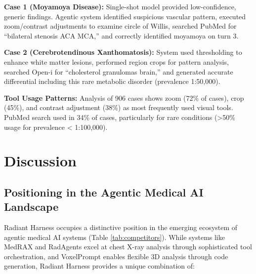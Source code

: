 \documentclass[11pt]{article}
\begin{document}
\textbf{Case 1 (Moyamoya Disease):} Single-shot model provided low-confidence, generic findings. Agentic system identified suspicious vascular pattern, executed zoom/contrast adjustments to examine circle of Willis, searched PubMed for ``bilateral stenosis ACA MCA,'' and correctly identified moyamoya on turn 3.

\textbf{Case 2 (Cerebrotendinous Xanthomatosis):} System used thresholding to enhance white matter lesions, performed region crops for pattern analysis, searched Open-i for ``cholesterol granulomas brain,'' and generated accurate differential including this rare metabolic disorder (prevalence 1:50,000).

\textbf{Tool Usage Patterns:} Analysis of 906 cases shows zoom (72\% of cases), crop (45\%), and contrast adjustment (38\%) as most frequently used visual tools. PubMed search used in 34\% of cases, particularly for rare conditions (\textgreater50\% usage for prevalence < 1:100,000).

\section{Discussion}
\label{sec:discussion}

\subsection{Positioning in the Agentic Medical AI Landscape}

Radiant Harness occupies a distinctive position in the emerging ecosystem of agentic medical AI systems (Table \ref{tab:competitors}). While systems like MedRAX and RadAgents excel at chest X-ray analysis through sophisticated tool orchestration, and VoxelPrompt enables flexible 3D analysis through code generation, Radiant Harness provides a unique combination of:
\end{document}
